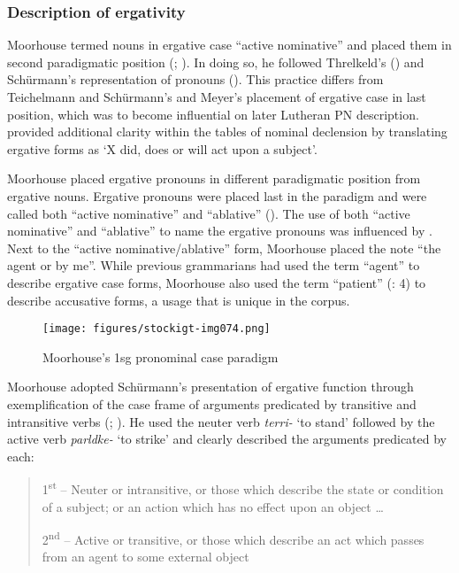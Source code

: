 \subsubsection{Description of ergativity}
\label{sec:key:6.4.1.5}

Moorhouse termed nouns in ergative case “active nominative” and placed them in second paradigmatic position (; ). In doing so, he followed Threlkeld’s () and Schürmann’s representation of pronouns (). This practice differs from Teichelmann and Schürmann’s and Meyer’s placement of ergative case in last position, which was to become influential on later Lutheran PN description. \citet[3]{moorhouse_vocabulary_1846} provided additional clarity within the tables of nominal declension by translating ergative forms as `X did, does or will act upon a subject'.

Moorhouse placed ergative pronouns in different paradigmatic position from ergative nouns. Ergative pronouns were placed last in the paradigm and were called both “active nominative” and “ablative” (). The use of both “active nominative” and “ablative” to name the ergative pronouns was influenced by \citet{teichelmann_outlines_1840}. Next to the “active nominative/ablative” form, Moorhouse placed the note “the agent or by me”. While previous grammarians had used the term “agent” to describe ergative case forms, Moorhouse also used the term “patient” (\citeyear{moorhouse_vocabulary_1846}: 4) to describe accusative forms, a usage that is unique in the corpus.

\begin{figure}[t]
\texttt{[image: figures/stockigt-img074.png]}
\caption{Moorhouse’s 1sg pronominal case paradigm \citeyearpar[10]{taplin_1879a_nodate}}
\label{fig:key:128}
\end{figure}

Moorhouse adopted Schürmann’s presentation of ergative function through exemplification of the case frame of arguments predicated by transitive and intransitive verbs (; ). He used the neuter verb \textit{terri-} `to stand' followed by the active verb \textit{parldke-} `to strike' \citeyearpar[19--23]{moorhouse_vocabulary_1846} and clearly described the arguments predicated by each:

\begin{quote}
1\textsuperscript{st} – Neuter or intransitive, or those which describe the state or condition of a subject; or an action which has no effect upon an object …

2\textsuperscript{nd} – Active or transitive, or those which describe an act which passes from an agent to some external object \citep[20]{moorhouse_vocabulary_1846}
\end{quote}


